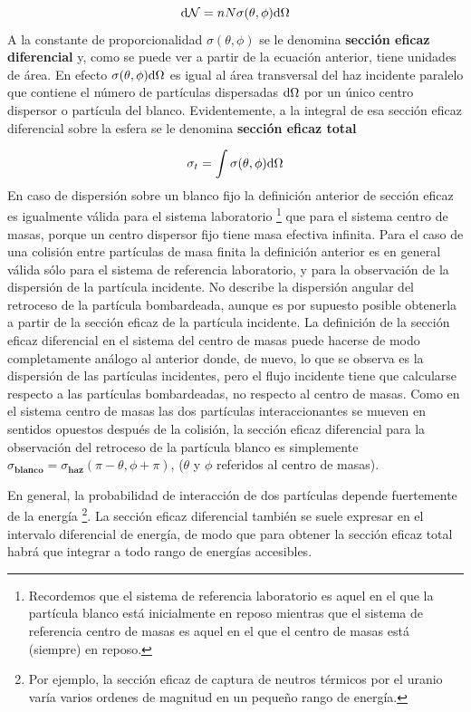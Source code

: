 \begin{equation}
	\mathrm{d} \mathcal{N} = n N \sigma (\theta,\phi) \mathrm{d} \Omega
\end{equation}
A la constante de proporcionalidad $\sigma(\theta,\phi)$ se le denomina \textbf{sección eficaz diferencial} y, como se puede ver a partir de la ecuación anterior, tiene unidades de área. En efecto $\sigma (\theta,\phi)\mathrm{d} \Omega$ es igual al área transversal del haz incidente paralelo que contiene el número de partículas dispersadas $\mathrm{d} \Omega$ por un único centro dispersor  o partícula del blanco. Evidentemente, a la integral de esa sección eficaz diferencial sobre la esfera se le denomina \textbf{sección eficaz total}

\begin{equation}
	\sigma_t = \int \sigma (\theta,\phi) \mathrm{d} \Omega
\end{equation}
En caso de dispersión sobre un blanco fijo la definición anterior de sección eficaz es igualmente válida para el sistema laboratorio \footnote{Recordemos que el sistema de referencia laboratorio es aquel en el que la partícula blanco está inicialmente en reposo mientras que el sistema de referencia centro de masas es aquel en el que el centro de masas está (siempre) en reposo.} que para el sistema centro de masas, porque un centro dispersor fijo tiene masa efectiva infinita. Para el caso de una colisión entre partículas de masa finita la definición anterior es en general válida sólo para el sistema de referencia laboratorio, y para la observación de la dispersión de la partícula incidente. No describe la dispersión angular del retroceso de la partícula bombardeada, aunque es por supuesto posible obtenerla a partir de la sección eficaz de la partícula incidente. La definición de la sección eficaz diferencial en el sistema del centro de masas puede hacerse de modo completamente análogo al anterior donde, de nuevo, lo que se observa es la dispersión de las partículas incidentes, pero el flujo incidente tiene que calcularse respecto a las partículas bombardeadas, no respecto al centro de masas. Como en el sistema centro de masas las dos partículas interaccionantes se mueven en sentidos opuestos después de la colisión, la sección eficaz diferencial para la observación del retroceso de la partícula blanco es simplemente $\sigma_{\textbf{blanco}} = \sigma_{\textbf{haz}} (\pi - \theta, \phi+\pi)$, ($\theta$ y $\phi$ referidos al centro de masas).

En general, la probabilidad de interacción de dos partículas depende fuertemente de la energía \footnote{Por ejemplo, la sección eficaz de captura de neutros térmicos por el uranio varía varios ordenes de magnitud en un pequeño rango de energía.}. La sección eficaz diferencial también se suele expresar en el intervalo diferencial de energía, de modo que para obtener la sección eficaz total habrá que integrar a todo rango de energías accesibles.

